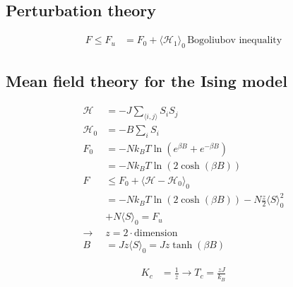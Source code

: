 \subsection*{Perturbation theory}
\begin{equation*}
    \begin{aligned}
        F \leq F_u &= F_0 + \langle \mathcal{H}_1 \rangle_0 \, \text{Bogoliubov inequality}
    \end{aligned}
\end{equation*}

\subsection*{Mean field theory for the Ising model}
\begin{equation*}
    \begin{aligned}
        \mathcal{H} &= -J \sum_{\langle i,j \rangle} S_i S_j \\
        \mathcal{H}_0 &= -B \sum_i S_i \\
        F_0 &= -N k_B T \ln \left(e^{\beta B} + e^{-\beta B}\right) \\
            &= -N k_B T \ln (2 \cosh(\beta B)) \\
        F &\leq F_0 + \langle \mathcal{H} - \mathcal{H}_0 \rangle_0 \\
            &= -N k_B T \ln(2 \cosh(\beta B)) - N \frac{z}{2} \langle S \rangle_0^2 \\
            &+ N \langle S \rangle_0 = F_u\\
        \rightarrow & z = 2 \cdot \text{dimension} \\
        B &= J z \langle S \rangle_0 = Jz \tanh(\beta B) 
    \end{aligned}
\end{equation*}

\begin{equation*}
    \begin{aligned}
        K_c &= \frac{1}{z} \rightarrow T_c = \frac{zJ}{k_B}
    \end{aligned}
\end{equation*}